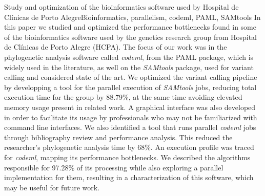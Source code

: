 \documentclass[cic,tc]{iiufrgs}
\begin{document}
\begin{englishabstract}{Study and optimization of the bioinformatics software used by Hospital de Clínicas de Porto Alegre}{Bioinformatics, parallelism, codeml, PAML, SAMtools}
In this paper we studied and optimized the performance bottlenecks found in
some of the bioinformatics software used by the genetics research group from
Hospital de Clínicas de Porto Alegre (HCPA). The focus of our work was in the
phylogenetic analysis software called \textit{codeml}, from the PAML package, which is
widely used in the literature, as well on the \textit{SAMtools} package, used for
variant calling and considered state of the art.
%
We optimized the variant calling pipeline by developping a tool for the
parallel execution of \textit{SAMtools} jobs, reducing total execution time
for the group by 88.79\%, at the same time avoiding elevated memory usage
present in related work. A graphical interface was also developed in order
to facilitate its usage by professionals who may not be
familiarized with command line interfaces.
%
We also identified a tool that runs parallel \textit{codeml} jobs through bibliography
review and performance analysis. This reduced the researcher's phylogenetic
analysis time by 68\%. An execution profile was traced for \textit{codeml}, mapping its
performance bottlenecks. We described the algorithms responsible for 97.28\% of
its processing while also exploring a parallel implementation for them,
resulting in a characterization of this software, which may be useful for
future work.
\end{englishabstract}

\listoffigures

\listoftables
\end{document}
